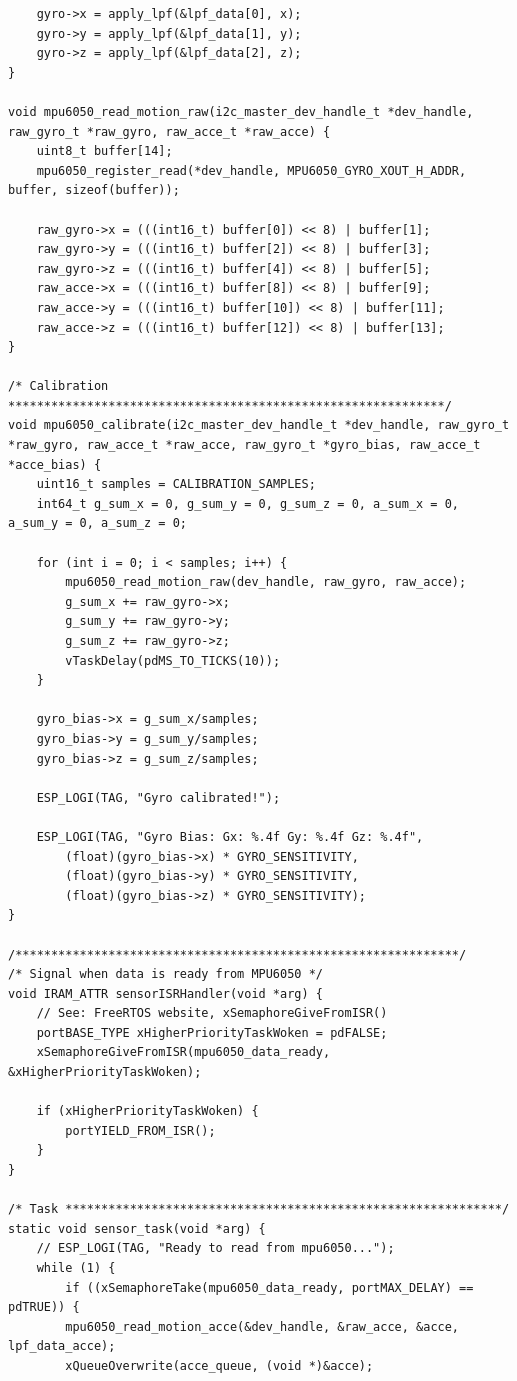 \begin{lstlisting}
    gyro->x = apply_lpf(&lpf_data[0], x);
    gyro->y = apply_lpf(&lpf_data[1], y);
    gyro->z = apply_lpf(&lpf_data[2], z);
}

void mpu6050_read_motion_raw(i2c_master_dev_handle_t *dev_handle, raw_gyro_t *raw_gyro, raw_acce_t *raw_acce) {
    uint8_t buffer[14];
    mpu6050_register_read(*dev_handle, MPU6050_GYRO_XOUT_H_ADDR, buffer, sizeof(buffer));

    raw_gyro->x = (((int16_t) buffer[0]) << 8) | buffer[1];
    raw_gyro->y = (((int16_t) buffer[2]) << 8) | buffer[3];
    raw_gyro->z = (((int16_t) buffer[4]) << 8) | buffer[5];
    raw_acce->x = (((int16_t) buffer[8]) << 8) | buffer[9];
    raw_acce->y = (((int16_t) buffer[10]) << 8) | buffer[11];
    raw_acce->z = (((int16_t) buffer[12]) << 8) | buffer[13];
}

/* Calibration *************************************************************/
void mpu6050_calibrate(i2c_master_dev_handle_t *dev_handle, raw_gyro_t *raw_gyro, raw_acce_t *raw_acce, raw_gyro_t *gyro_bias, raw_acce_t *acce_bias) {
    uint16_t samples = CALIBRATION_SAMPLES;
    int64_t g_sum_x = 0, g_sum_y = 0, g_sum_z = 0, a_sum_x = 0, a_sum_y = 0, a_sum_z = 0;

    for (int i = 0; i < samples; i++) {
        mpu6050_read_motion_raw(dev_handle, raw_gyro, raw_acce);
        g_sum_x += raw_gyro->x;
        g_sum_y += raw_gyro->y;
        g_sum_z += raw_gyro->z;
        vTaskDelay(pdMS_TO_TICKS(10)); 
    }

    gyro_bias->x = g_sum_x/samples;
    gyro_bias->y = g_sum_y/samples;
    gyro_bias->z = g_sum_z/samples;

    ESP_LOGI(TAG, "Gyro calibrated!");

    ESP_LOGI(TAG, "Gyro Bias: Gx: %.4f Gy: %.4f Gz: %.4f",
        (float)(gyro_bias->x) * GYRO_SENSITIVITY,
        (float)(gyro_bias->y) * GYRO_SENSITIVITY,
        (float)(gyro_bias->z) * GYRO_SENSITIVITY);
}

/**************************************************************/
/* Signal when data is ready from MPU6050 */
void IRAM_ATTR sensorISRHandler(void *arg) {
    // See: FreeRTOS website, xSemaphoreGiveFromISR()
    portBASE_TYPE xHigherPriorityTaskWoken = pdFALSE;
    xSemaphoreGiveFromISR(mpu6050_data_ready, &xHigherPriorityTaskWoken);

    if (xHigherPriorityTaskWoken) {
        portYIELD_FROM_ISR();
    }
}

/* Task *************************************************************/
static void sensor_task(void *arg) {
    // ESP_LOGI(TAG, "Ready to read from mpu6050...");
    while (1) {
        if ((xSemaphoreTake(mpu6050_data_ready, portMAX_DELAY) == pdTRUE)) {
        mpu6050_read_motion_acce(&dev_handle, &raw_acce, &acce, lpf_data_acce);
        xQueueOverwrite(acce_queue, (void *)&acce);


\end{lstlisting}
